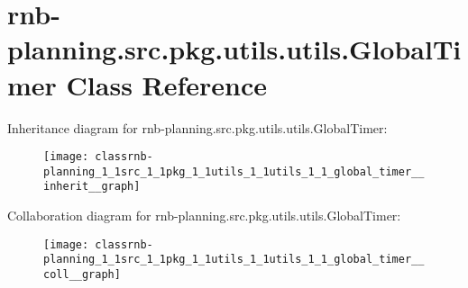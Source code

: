 \hypertarget{classrnb-planning_1_1src_1_1pkg_1_1utils_1_1utils_1_1_global_timer}{}\section{rnb-\/planning.src.\+pkg.\+utils.\+utils.\+Global\+Timer Class Reference}
\label{classrnb-planning_1_1src_1_1pkg_1_1utils_1_1utils_1_1_global_timer}


Inheritance diagram for rnb-\/planning.src.\+pkg.\+utils.\+utils.\+Global\+Timer\+:
\nopagebreak
\begin{figure}[H]
\begin{center}
\leavevmode
\texttt{[image: classrnb-planning\_1\_1src\_1\_1pkg\_1\_1utils\_1\_1utils\_1\_1\_global\_timer\_\_inherit\_\_graph]}
\end{center}
\end{figure}


Collaboration diagram for rnb-\/planning.src.\+pkg.\+utils.\+utils.\+Global\+Timer\+:
\nopagebreak
\begin{figure}[H]
\begin{center}
\leavevmode
\texttt{[image: classrnb-planning\_1\_1src\_1\_1pkg\_1\_1utils\_1\_1utils\_1\_1\_global\_timer\_\_coll\_\_graph]}
\end{center}
\end{figure}
